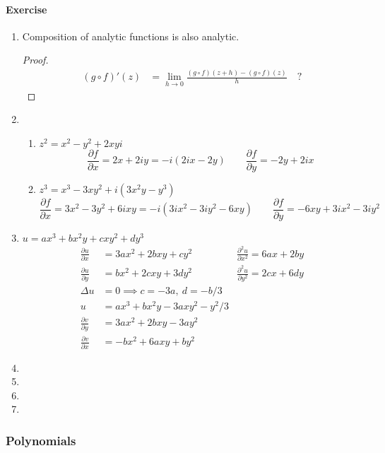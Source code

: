 \paragraph{Exercise}
\begin{enumerate}
	\item Composition of analytic functions is also analytic.
	\begin{proof}
	\begin{align*}
		(g \circ f)'(z)
		& = \lim_{h \to 0} \frac{(g \circ f)(z+h) - (g \circ f)(z)}{h} \quad ? 
	\end{align*}
	\end{proof}
	\item 
	\begin{enumerate}
		\item $z^2  = x^2-y^2 + 2xyi$
			\[ \frac{\partial f}{\partial x} = 2x+2iy = -i(2ix-2y) \qquad \frac{\partial f}{\partial y} = -2y+2ix \]
		\item $z^3 = x^3-3xy^2+i(3x^2y-y^3)$
			\[ \frac{\partial f}{\partial x} = 3x^2-3y^2+6ixy = -i(3ix^2-3iy^2-6xy) \qquad \frac{\partial f}{\partial y} = -6xy+3ix^2-3iy^2 \]
	\end{enumerate}
	\item $u = ax^3+bx^2y+cxy^2+dy^3$
	\begin{align*}
		\frac{\partial u}{\partial x} 
		&= 3ax^2+2bxy+cy^2 & \frac{\partial^2 u}{\partial x^2} = 6ax+2by \\
		\frac{\partial u}{\partial y}
		& = bx^2+2cxy+3dy^2  & \frac{\partial^2 u}{\partial y^2} = 2cx+6dy \\
		\Delta u & = 0 \implies c = -3a,\ d = -b/3 \\
		u & = ax^3+bx^2y-3axy^2-y^2/3 \\
		\frac{\partial v}{\partial y} & = 3ax^2 + 2bxy-3ay^2 \\
		\frac{\partial v}{\partial x} & = -bx^2 + 6axy+by^2 
	\end{align*}
	\item
	\item 
	\item
	\item
\end{enumerate}

\subsubsection{Polynomials}
